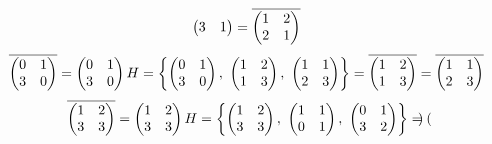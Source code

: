 \documentclass[11pt, fleqn]{article}
\begin{document}
\begin{enumerate}
\[{\begin{pmatrix}
          3 & 1
      \end{pmatrix}} = \overline{\begin{pmatrix}
          1 & 2\\
          2 & 1
      \end{pmatrix}}\]
      \[\overline{\begin{pmatrix}
          0 & 1\\
          3 & 0
      \end{pmatrix}} = \begin{pmatrix}
          0 & 1\\
          3 & 0
      \end{pmatrix} H = \left\{ \begin{pmatrix}
          0 & 1\\
          3 & 0
      \end{pmatrix},\ \begin{pmatrix}
          1 & 2\\
          1 & 3
      \end{pmatrix},\ \begin{pmatrix}
          1 & 1\\
          2 & 3
      \end{pmatrix} \right\} = \overline{\begin{pmatrix}
          1 & 2\\
          1 & 3
      \end{pmatrix}} = \overline{\begin{pmatrix}
          1 & 1\\
          2 & 3
      \end{pmatrix}}\]
      \[\overline{\begin{pmatrix}
          1 & 2\\
          3 & 3
      \end{pmatrix}} = \begin{pmatrix}
          1 & 2\\
          3 & 3
      \end{pmatrix} H = \left\{ \begin{pmatrix}
          1 & 2\\
          3 & 3
      \end{pmatrix},\ \begin{pmatrix}
          1 & 1\\
          0 & 1
      \end{pmatrix},\ \begin{pmatrix}
          0 & 1\\
          3 & 2
      \end{pmatrix} \right\} = \overline{\begin{pmatrix}

\end{pmatrix}}\]
\end{enumerate}
\end{document}
